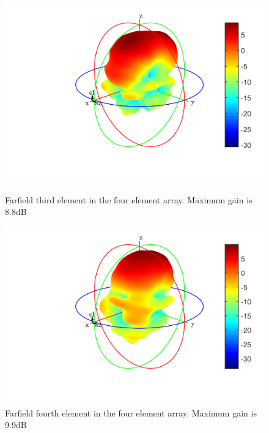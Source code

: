 \begin{figure}[H]
  \centering
  \begin{minipage}[b]{0.5\textwidth}
	\includegraphics[scale = 0.5]{figures/measurement/antennas/3rd_element_4_array.png}
	\caption{Farfield third element in the four element array. Maximum gain is 8.8dB}
    \label{fig:chamber_four_ant_ff_3}
  \end{minipage}
  \hfill
  \begin{minipage}[b]{0.4\textwidth}
\includegraphics[scale = 0.5]{figures/measurement/antennas/4th_element_4_array.png}
\caption{Farfield fourth element in the four element array. Maximum gain is 9.9dB}
    \label{fig:chamber_four_ant_ff_4}
  \end{minipage}
\end{figure}


